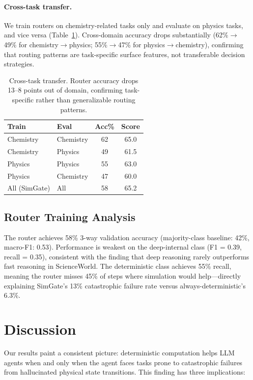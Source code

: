 \documentclass[11pt,a4paper]{article}
\begin{document}
\paragraph{Cross-task transfer.}
We train routers on chemistry-related tasks only and evaluate on physics tasks, and vice versa (Table~\ref{tab:transfer}). Cross-domain accuracy drops substantially (62\%$\to$49\% for chemistry$\to$physics; 55\%$\to$47\% for physics$\to$chemistry), confirming that routing patterns are task-specific surface features, not transferable decision strategies.

\begin{table}[t]
\centering
\small
\begin{tabular}{llcc}
\toprule
\textbf{Train} & \textbf{Eval} & \textbf{Acc\%} & \textbf{Score} \\
\midrule
Chemistry & Chemistry & 62 & 65.0 \\
Chemistry & Physics & 49 & 61.5 \\
Physics & Physics & 55 & 63.0 \\
Physics & Chemistry & 47 & 60.0 \\
All (SimGate) & All & 58 & 65.2 \\
\bottomrule
\end{tabular}
\caption{Cross-task transfer. Router accuracy drops 13--8 points out of domain, confirming task-specific rather than generalizable routing patterns.}
\label{tab:transfer}
\end{table}

\subsection{Router Training Analysis}

The router achieves 58\% 3-way validation accuracy (majority-class baseline: 42\%, macro-F1: 0.53). Performance is weakest on the deep-internal class (F1 = 0.39, recall = 0.35), consistent with the finding that deep reasoning rarely outperforms fast reasoning in ScienceWorld. The deterministic class achieves 55\% recall, meaning the router misses 45\% of steps where simulation would help---directly explaining SimGate's 13\% catastrophic failure rate versus always-deterministic's 6.3\%.

\section{Discussion}

Our results paint a consistent picture: deterministic computation helps LLM agents when and only when the agent faces tasks prone to catastrophic failures from hallucinated physical state transitions. This finding has three implications:
\end{document}
